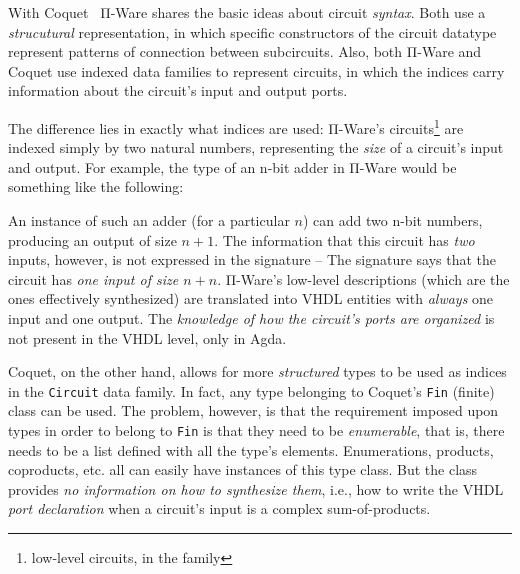         With Coquet~\cite{coquet2011} Π-Ware shares the basic ideas about circuit \emph{syntax}.
        Both use a \emph{strucutural} representation, in which specific constructors of the circuit
        datatype represent patterns of connection between subcircuits.
        Also, both Π-Ware and Coquet use indexed data families to represent circuits, in which
        the indices carry information about the circuit's input and output ports.

        The difference lies in exactly what indices are used: Π-Ware's
        circuits\footnote{low-level circuits, in the  family}
        are indexed simply by two natural numbers, representing the \emph{size} of a circuit's input and output.
        For example, the type of an n-bit adder in Π-Ware would be something like the following:

        \begin{center}
             \AY{:}  \AY{(} \AF{+} \AY{)} \AY{(} \AY{)}
        \end{center}

        An instance of such an adder (for a particular $n$) can add two n-bit numbers, producing
        an output of size $n+1$. The information that this circuit has \emph{two} inputs, however,
        is not expressed in the signature – The signature says that the circuit has
        \emph{one input of size $n+n$}.
        Π-Ware's low-level descriptions (which are the ones effectively synthesized) are translated
        into \ac{VHDL} entities with \emph{always} one input and one output.
        The \emph{knowledge of how the circuit's ports are organized} is not present in the \ac{VHDL}
        level, only in Agda.

        Coquet, on the other hand, allows for more \emph{structured} types to be used as indices in
        the \texttt{Circuit} data family.
        In fact, any type belonging to Coquet's \texttt{Fin} (finite) class can be used.
        The problem, however, is that the requirement imposed upon types in order to belong to
        \texttt{Fin} is that they need to be \emph{enumerable}, that is, there needs to be a
        list defined with all the type's elements.
        Enumerations, products, coproducts, etc. all can easily have instances of this type class.
        But the class provides \emph{no information on how to synthesize them}, i.e.,
        how to write the \ac{VHDL} \emph{port declaration} when a circuit's input is a complex
        sum-of-products.

